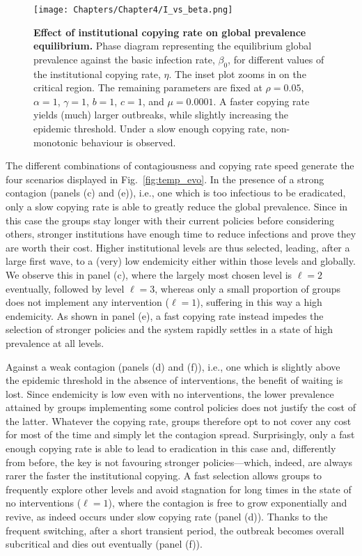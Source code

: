 \begin{figure}
  \centering	
    \texttt{[image: Chapters/Chapter4/I\_vs\_beta.png]}  
  \caption[Effect of institutional copying rate on global prevalence equilibrium]{ \textbf{Effect of institutional copying rate on global prevalence equilibrium.}
  Phase diagram representing the equilibrium global prevalence against the basic infection rate, $\beta_0$, for different values of the institutional copying rate, $\eta$. The inset plot zooms in on the critical region. The remaining parameters are fixed at $\rho = 0.05$, $\alpha=1$, $\gamma=1$, $b=1$, $c=1$, and $\mu = 0.0001$. A faster copying rate yields (much) larger outbreaks, while slightly increasing the epidemic threshold. Under a slow enough copying rate, non-monotonic behaviour is observed.
  }
  \label{fig:call4action}
\end{figure}

The different combinations of contagiousness and copying rate speed generate the four scenarios displayed in Fig.~\ref{fig:temp_evo}. In the presence of a strong contagion (panels (c) and (e)), i.e., one which is too infectious to be eradicated, only a slow copying rate is able to greatly reduce the global prevalence. Since in this case the groups stay longer with their current policies before considering others, stronger institutions have enough time to reduce infections and prove they are worth their cost. Higher institutional levels are thus selected, leading, after a large first wave, to a (very) low endemicity either within those levels and globally. We observe this in panel (c), where the largely most chosen level is $\ell = 2$ eventually, followed by level $\ell = 3$, whereas only a small proportion of groups does not implement any intervention ($\ell = 1$), suffering in this way a high endemicity. As shown in panel (e), a fast copying rate instead impedes the selection of stronger policies and the system rapidly settles in a state of high prevalence at all levels.

Against a weak contagion (panels (d) and (f)), i.e., one which is slightly above the epidemic threshold in the absence of interventions, the benefit of waiting is lost. Since endemicity is low even with no interventions, the lower prevalence attained by groups implementing some control policies does not justify the cost of the latter. Whatever the copying rate, groups therefore opt to not cover any cost for most of the time and simply let the contagion spread. Surprisingly, only a fast enough copying rate is able to lead to eradication in this case and, differently from before, the key is not favouring stronger policies---which, indeed, are always rarer the faster the institutional copying. A fast selection allows groups to frequently explore other levels and avoid stagnation for long times in the state of no interventions ($\ell = 1$), where the contagion is free to grow exponentially and revive, as indeed occurs under slow copying rate (panel (d)). Thanks to the frequent switching, after a short transient period, the outbreak becomes overall subcritical and dies out eventually (panel (f)).


